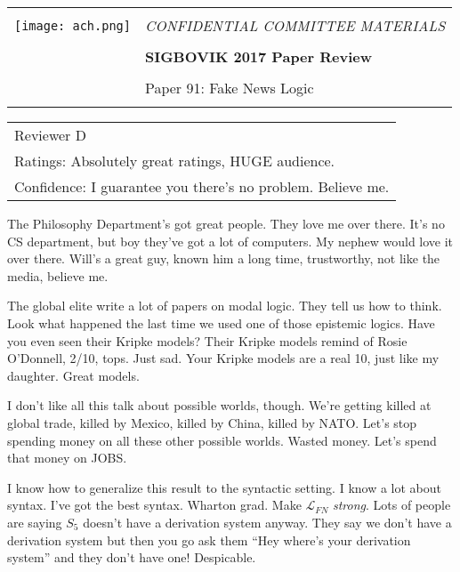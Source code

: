 \documentclass[12pt]{article}
\begin{document}
{\sffamily
\begin{tabular}{ll}
\multirow{3}{*}{\texttt{[image: ach.png]}}\\
& \Large{\em CONFIDENTIAL COMMITTEE MATERIALS} \\
&\\
& \textbf{\Huge{SIGBOVIK 2017 Paper Review}} \\
&\\
& \LARGE{Paper 91: Fake News Logic} \\
&\\
\hline
\end{tabular}}
\vspace{2em}
\thispagestyle{empty}

{\large\bf
\begin{tabular}{l}
Reviewer D\\
Ratings:  Absolutely great ratings, HUGE audience. \\
Confidence: I guarantee you there's no problem. Believe me.\\
\end{tabular}}
\vspace{1em}

The Philosophy Department's got great people.
They love me over there.
It's no CS department, but boy they've got a lot of computers.
My nephew would love it over there.
Will's a great guy, known him a long time, trustworthy, not like the media, believe me.

The global elite write a lot of papers on modal logic. They tell us how to think. Look what happened the last time we used one of those epistemic logics. Have you even seen their Kripke models? Their Kripke models remind of Rosie O'Donnell, 2/10, tops. Just sad. Your Kripke models are a real 10, just like my daughter. Great models.

I don't like all this talk about possible worlds, though.
We're getting killed at global trade, killed by Mexico, killed by China, killed by NATO.
Let's stop spending money on all these other possible worlds. Wasted money.
Let's spend that money on JOBS.

I know how to generalize this result to the syntactic setting.
I know a lot about syntax.
I've got the best syntax. Wharton grad.
Make $\mathcal{L}_{\mathit{FN}}$ \emph{strong}.
Lots of people are saying $S_5$ doesn't have a derivation system anyway.
They say we don't have a derivation system but then you go ask them ``Hey where's your derivation system'' and they don't have one!
Despicable.
\end{document}
